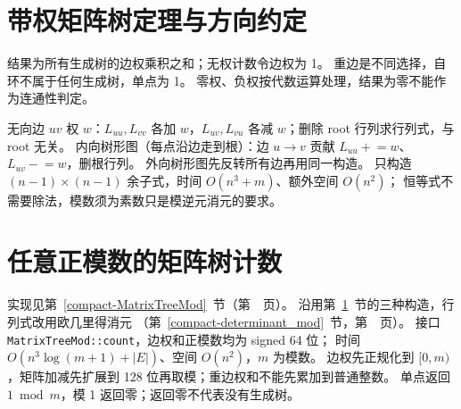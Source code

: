 \section{带权矩阵树定理与方向约定}\label{knowledge-matrix-tree-weighted}
结果为所有生成树的边权乘积之和；无权计数令边权为 1。
重边是不同选择，自环不属于任何生成树，单点为 1。
零权、负权按代数运算处理，结果为零不能作为连通性判定。

无向边 $uv$ 权 $w$：$L_{uu},L_{vv}$ 各加 $w$，$L_{uv},L_{vu}$ 各减 $w$；删除 root 行列求行列式，与 root 无关。
内向树形图（每点沿边走到根）：边 $u\to v$ 贡献 $L_{uu}\mathrel{+}=w$、$L_{uv}\mathrel{-}=w$，删根行列。
外向树形图先反转所有边再用同一构造。
只构造 $(n-1)\times(n-1)$ 余子式，时间 $O(n^3+m)$、额外空间 $O(n^2)$；
恒等式不需要除法，模数须为素数只是模逆元消元的要求。

\section{任意正模数的矩阵树计数}\label{knowledge-matrix-tree-mod}
实现见第~\ref{compact-MatrixTreeMod}~节（第~\pageref{compact-MatrixTreeMod}~页）。
沿用第~\ref{knowledge-matrix-tree-weighted}~节的三种构造，行列式改用欧几里得消元
（第~\ref{compact-determinant_mod}~节，第~\pageref{compact-determinant_mod}~页）。
接口 \texttt{MatrixTreeMod::count}，边权和正模数均为 signed 64 位；
时间 $O(n^3\log(m+1)+|E|)$、空间 $O(n^2)$，$m$ 为模数。
边权先正规化到 $[0,m)$，矩阵加减先扩展到 128 位再取模；重边权和不能先累加到普通整数。
单点返回 $1\bmod m$，模 1 返回零；返回零不代表没有生成树。
